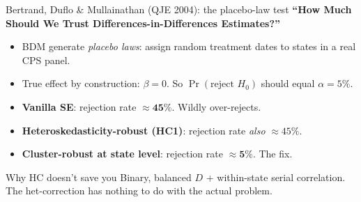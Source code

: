 \documentclass[aspectratio=169,11pt]{beamer}
\begin{document}
\begin{frame}{Bertrand, Duflo \& Mullainathan (QJE 2004): the placebo-law test}
\vspace{0.4em}
\textbf{``How Much Should We Trust Differences-in-Differences Estimates?''}
\vspace{0.4em}
\begin{itemize}\small
  \item BDM generate \textit{placebo laws}: assign random treatment dates to states in a real CPS panel.
  \item True effect by construction: $\beta = 0$. So $\Pr(\text{reject } H_0)$ should equal $\alpha = 5\%$.
  \item \textbf{Vanilla SE}: rejection rate $\approx \mathbf{45\%}$. Wildly over-rejects.
  \item \textbf{Heteroskedasticity-robust (HC1)}: rejection rate \textit{also} $\approx 45\%$. 
  \item \textbf{Cluster-robust at state level}: rejection rate $\approx \mathbf{5\%}$. \;The fix.
\end{itemize}
\vspace{0.4em}
\begin{block}{Why HC doesn't save you}
\small
Binary, balanced $D$ + within-state serial correlation. \;The het-correction has nothing to do with the actual problem. \;
\end{block}
\end{frame}

\end{document}

